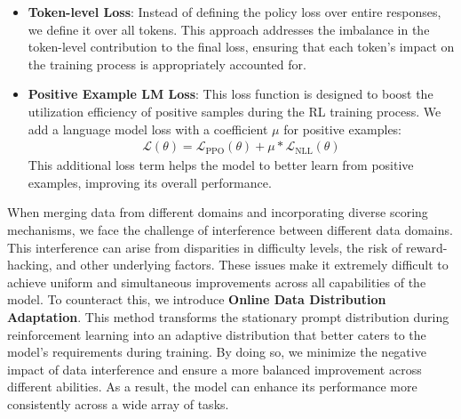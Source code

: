 \begin{itemize}
    \item \textbf{Token-level Loss}: Instead of defining the policy loss over entire responses, we define it over all tokens. This approach addresses the imbalance in the token-level contribution to the final loss, ensuring that each token's impact on the training process is appropriately accounted for.
    \item \textbf{Positive Example LM Loss}: This loss function is designed to boost the utilization efficiency of positive samples during the RL training process. We add a language model loss with a coefficient $\mu$ for positive examples:
    \begin{align}
    \mathcal{L}(\theta) = \mathcal{L}_{\text{PPO}}(\theta)+\mu * \mathcal{L}_{\text{NLL}}(\theta)
    \end{align}
This additional loss term helps the model to better learn from positive examples, improving its overall performance.
\end{itemize}

When merging data from different domains and incorporating diverse scoring mechanisms, we face the challenge of interference between different data domains. This interference can arise from disparities in difficulty levels, the risk of reward-hacking, and other underlying factors. These issues make it extremely difficult to achieve uniform and simultaneous improvements across all capabilities of the model. To counteract this, we introduce \textbf{Online Data Distribution Adaptation}. This method transforms the stationary prompt distribution during reinforcement learning into an adaptive distribution that better caters to the model's requirements during training. By doing so, we minimize the negative impact of data interference and ensure a more balanced improvement across different abilities. As a result, the model can enhance its performance more consistently across a wide array of tasks.



